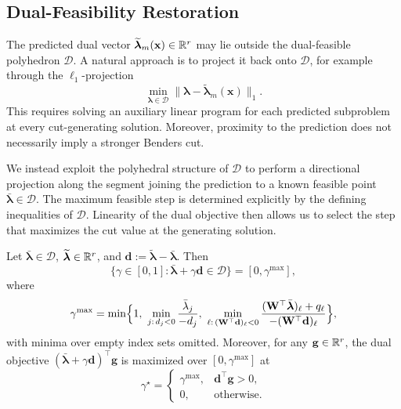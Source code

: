 \subsection{Dual-Feasibility Restoration}
\label{subsec:repair}

The predicted dual vector
$\widetilde{\boldsymbol\lambda}_m(\mathbf x)\in\mathbb{R}^r$
may lie outside the dual-feasible polyhedron
$\mathcal D$. A natural approach is to project it
back onto $\mathcal D$, for example through the
$\ell_1$-projection
\begin{equation}\label{eq:projection}
\min_{\boldsymbol\lambda\in\mathcal D}
\bigl\|\boldsymbol\lambda-
\widetilde{\boldsymbol\lambda}_m(\mathbf x)\bigr\|_1.
\end{equation}
This requires solving an auxiliary linear program
for each predicted subproblem at every cut-generating
solution. Moreover, proximity to the prediction
does not necessarily imply a stronger Benders cut.

We instead exploit the polyhedral structure of
$\mathcal D$ to perform a directional projection
along the segment joining the prediction to a known
feasible point $\bar{\boldsymbol\lambda}\in\mathcal D$.
The maximum feasible step is determined explicitly
by the defining inequalities of $\mathcal D$.
Linearity of the dual objective then allows us to
select the step that maximizes the cut value at
the generating solution.

\begin{proposition}
\label{prop:repair}
Let $\bar{\boldsymbol\lambda}\in\mathcal D$,
$\widetilde{\boldsymbol\lambda}\in\mathbb{R}^r$, and
$\mathbf d:=\widetilde{\boldsymbol\lambda}
-\bar{\boldsymbol\lambda}$. Then
\[
\{\gamma\in[0,1]:
\bar{\boldsymbol\lambda}+\gamma\mathbf d\in\mathcal D\}
=[0,\gamma^{\max}],
\]
where
\begin{equation}\label{eq:gamma-max}
\gamma^{\max}
=\min\Bigl\{
1,\
\min_{j:\,d_j<0}\frac{\bar\lambda_j}{-d_j},\
\min_{\ell:\,(\mathbf W^\top\mathbf d)_\ell<0}
\frac{(\mathbf W^\top\bar{\boldsymbol\lambda})_\ell+q_\ell}
{-(\mathbf W^\top\mathbf d)_\ell}
\Bigr\},
\end{equation}
with minima over empty index sets omitted.
Moreover, for any $\mathbf g\in\mathbb{R}^r$, the dual
objective $(\bar{\boldsymbol\lambda}+
\gamma\mathbf d)^\top\mathbf g$ is maximized
over $[0,\gamma^{\max}]$ at
\begin{equation}\label{eq:guard}
\gamma^\star=
\begin{cases}
\gamma^{\max}, & \mathbf d^\top\mathbf g>0,\\
0, & \text{otherwise}.
\end{cases}
\end{equation}
\end{proposition}

